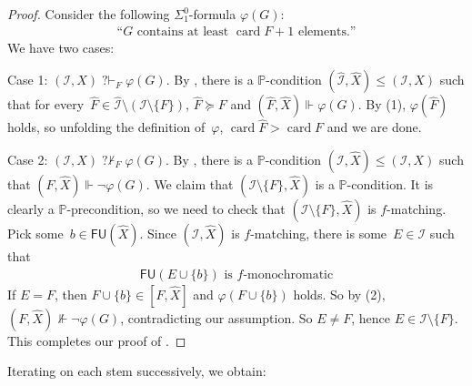 \documentclass{article}
\def\PP{\mathbb{P}}
\def\I{\mathcal{I}}
\newcommand{\qvdash}{\operatorname{{?}{\vdash}}}
\newcommand{\nqvdash}{\operatorname{{?}{\nvdash}}}
\newcommand{\card}{\operatorname{card}}
\newcommand{\FU}[0]{\mathsf{FU}} %
\def\qt#1{``#1''}%
\def\h#1{\hat{#1}}
\numberwithin{theorem}{section}
\newtheorem{lemma}[theorem]{Lemma}
\begin{document}
\begin{proof}
Consider the following $\Sigma^0_1$-formula $\varphi(G)$:
\begin{align*}
\text{\qt{$G$ contains at least~$\card F + 1$ elements.}}
\end{align*}
We have two cases:
\smallskip

\noindent
Case 1: $(\I, X) \qvdash_F \varphi(G)$. By , there is a $\PP$-condition $(\h \I, \h X) \leq (\I, X)$ such that for every~$\h F \in \h \I \setminus (\I \setminus \{F\})$, $\h F \succeq F$ and $(\h F, \h X) \Vdash \varphi(G)$. By (1), $\varphi(\h F)$ holds, so unfolding the definition of~$\varphi$, $\card \h F > \card F$ and we are done.
\smallskip

\noindent
Case 2: $(\I, X) \nqvdash_F \varphi(G)$. By , there is a $\PP$-condition $(\I, \h X) \leq (\I, X)$ such that $(F, \h X) \Vdash \neg \varphi(G)$. We claim that $(\I \setminus \{F\}, \h X)$ is a $\PP$-condition.
It is clearly a $\PP$-precondition, so we need to check that $(\I \setminus \{F\}, \h X)$ is $f$-matching.
Pick some~$b \in \FU(\h X)$. Since $(\I, \h X)$ is $f$-matching, there is some~$E \in \I$ such that
\begin{align}
\text{$\FU(E \cup \{b\})$ is $f$-monochromatic}
\end{align}
If $E = F$, then $F \cup \{b\} \in [F, \h X]$ and $\varphi(F \cup \{b\})$ holds. So by (2), $(F, \h X) \not\Vdash \neg \varphi(G)$, contradicting our assumption. So $E \neq F$, hence $E \in \I \setminus \{F\}$.
This completes our proof of .
\end{proof}

Iterating  on each stem successively, we obtain:

\end{document}
